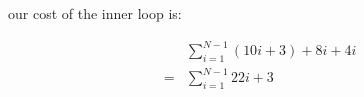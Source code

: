 \documentclass{article}
\begin{document}
our cost of the inner loop is:

\begin{align*}
&\sum_{i=1}^{N-1} (10i + 3) + 8i + 4i\\
=&\sum_{i=1}^{N-1} 22i + 3
\end{align*}
\end{document}
